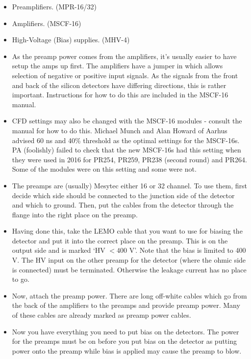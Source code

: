 \documentclass[11pt]{report}
\begin{document}
\begin{itemize}

 \item Preamplifiers. (MPR-16/32)
 \item Amplifiers. (MSCF-16)
 \item High-Voltage (Bias) supplies. (MHV-4)
 
\item As the preamp power comes from the amplifiers, it’s usually easier to have setup the amps up first. The amplifiers have a jumper in which allows selection of negative or positive input signals. As the signals from the front and back of the silicon detectors have differing directions, this is rather important. Instructions for how to do this are included in the MSCF-16 manual.

\item CFD settings may also be changed with the MSCF-16 modules - consult the manual for how to do this. Michael Munch and Alan Howard of Aarhus advised 60 ns and 40\% threshold as the optimal settings for the MSCF-16s. PA (foolishly) failed to check that the new MSCF-16s had this setting when they were used in 2016 for PR254, PR259, PR238 (second round) and PR264. Some of the modules were on this setting and some were not.

\item The preamps are (usually) Mesytec either 16 or 32 channel. To use them, first decide which side should be connected to the junction side of the detector and which to ground. Then, put the cables from the detector through the flange into the right place on the preamp.

\item Having done this, take the LEMO cable that you want to use for biasing the detector and put it into the correct place on the preamp. This is on the output side and is marked ‘HV $<400$ V’. Note that the bias is limited to 400 V. The HV input on the other preamp for the detector (where the ohmic side is connected) must be terminated. Otherwise the leakage current has no place to go.

\item Now, attach the preamp power. There are long off-white cables which go from the back of the amplifiers to the preamps and provide preamp power. Many of these cables are already marked as preamp power cables.

\item Now you have everything you need to put bias on the detectors. The power for the preamps must be on before you put bias on the detector as putting power onto the preamp while bias is applied may cause the preamp to blow.


\end{itemize}
\end{document}

